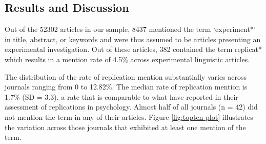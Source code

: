 \documentclass[cm,linguex]{glossa}
\begin{document}
\hypertarget{results-and-discussion}{%
\subsection{Results and Discussion}\label{results-and-discussion}}

Out of the 52302 articles in our sample, 8437 mentioned the term `experiment*' in title, abstract, or keywords and were thus assumed to be articles presenting an experimental investigation.
Out of these articles, 382 contained the term replicat* which results in a mention rate of 4.5\% across experimental linguistic articles.

The distribution of the rate of replication mention substantially varies across journals ranging from 0 to 12.82\%. The median rate of replication mention is 1.7\% (SD = 3.3), a rate that is comparable to what \citet{makel_replications_2012} have reported in their assessment of replications in psychology.
Almost half of all journals (n = 42) did not mention the term in any of their articles.
Figure \ref{fig:topten-plot} illustrates the variation across those journals that exhibited at least one mention of the term.
\end{document}
